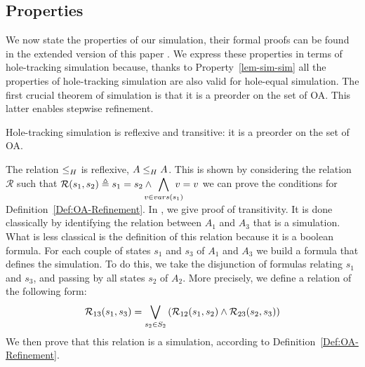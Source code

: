 \documentclass[runningheads]{llncs}
\begin{document}
\subsection{Properties}

We now  state the properties of our simulation, their formal proofs  can be found in  the extended version of this paper \cite{henrio:hal-04193421}. We express these properties  in terms of hole-tracking simulation because, thanks to Property~\ref{lem-sim-sim}   all the properties  of hole-tracking simulation are also valid  for hole-equal simulation.
The first crucial theorem of  simulation  is that it is  a  preorder on the set of OA. This latter enables stepwise refinement.


\begin{theorem}\label{thm:preoder}
Hole-tracking simulation
   is reflexive  and  transitive:  it  is  a  preorder on the set of OA.
\end{theorem}

\begin{proofsketch}
 
The relation  \(\wrel{}{}{H}\) is reflexive,  \(\wrel{A}{A}{H}\). This is shown  by considering the relation $\mathcal{R}$ such that $\mathcal{R}\mpar{s_1, s_2} \triangleq s_1=s_2\land \displaystyle\bigwedge_\subbox{v \in vars(s_1)} {v=v}$   we can prove the conditions for Definition~\ref{Def:OA-Refinement}.
%
In \cite{henrio:hal-04193421}, we give proof of transitivity. It is done classically by identifying the relation between $A_1$ and $A_3$ that is a simulation. What is less classical is the definition of this relation because it is a boolean formula. For each couple of states  $s_1$ and $s_3$ of $A_1$ and $A_3$ we build a  formula that defines the simulation. To do this, we take the disjunction of formulas relating $s_1$ and $s_3$, and passing by all states $s_2$ of $A_2$. More precisely, we define a relation of the following form:
  \[\mathcal{R}_{13}(s_1,s_3)=\bigvee_{s_2\in S_2}\mpar{\mathcal{R}_{12}(s_1,s_2) \land \mathcal{R}_{23}(s_2,s_3) } \]
We then prove that this relation  is a simulation, according to Definition~\ref{Def:OA-Refinement}.
\end{proofsketch}
\end{document}
